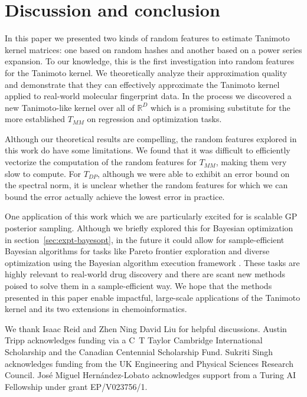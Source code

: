 \documentclass{article}
\theoremstyle{plain}
\theoremstyle{definition}
\theoremstyle{remark}
\begin{document}
\section{Discussion and conclusion}\label{sec:conclusion}

In this paper we presented two kinds of random features to estimate Tanimoto kernel matrices:
one based on random hashes and another based on a power series expansion.
To our knowledge, this is the first investigation into random features for the Tanimoto kernel.
We theoretically analyze their approximation quality 
and demonstrate that they can effectively approximate the Tanimoto kernel applied
to real-world molecular fingerprint data.
In the process we discovered a new Tanimoto-like kernel over all of $\mathbb{R}^D$
which is a promising substitute for the more established $T_{MM}$
on regression and optimization tasks.

Although our theoretical results are compelling, the random features explored in this work do have some limitations.
We found that it was difficult to efficiently vectorize the computation of the random features for $T_{MM}$,
making them very slow to compute.
For $T_{DP}$, although we were able to exhibit an error bound on the spectral norm,
it is unclear whether the random features for which we can bound the error actually achieve the lowest error in practice.

One application of this work which we are particularly excited for is scalable GP posterior sampling.
Although we briefly explored this for Bayesian optimization in section~\ref{sec:expt-bayesopt},
in the future it could allow for sample-efficient Bayesian algorithms for tasks like Pareto frontier exploration and 
diverse optimization using the Bayesian algorithm execution framework \citep{neiswanger2021bayesian}.
These tasks are highly relevant to real-world drug discovery and there are scant new methods poised
to solve them in a sample-efficient way.
We hope that the methods presented in this paper enable impactful, large-scale applications of the Tanimoto kernel and its two extensions in chemoinformatics.








\newpage



\begin{ack}

We thank Isaac Reid and  Zhen Ning David Liu for helpful discussions.
Austin Tripp acknowledges funding via a C~T Taylor Cambridge International Scholarship and the  Canadian Centennial Scholarship Fund.
Sukriti Singh acknowledges funding from the UK Engineering and Physical Sciences Research Council.
José Miguel Hernández-Lobato acknowledges support from a Turing AI Fellowship under grant EP/V023756/1.
\end{ack}
\end{document}
